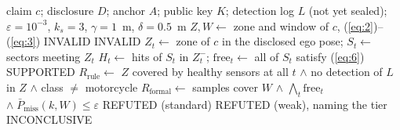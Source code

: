 \begin{algorithm}[!t]
\caption{Verification of a Claim}
\label{alg:verify}
\footnotesize
\begin{algorithmic}[1]
\Require claim $c$; disclosure $D$; anchor $A$; public key $K$; detection log $L$ (not yet sealed); $\varepsilon=10^{-3}$, $k_s=3$, $\gamma=1$~m, $\delta=0.5$~m
\State $Z, W \gets$ zone and window of $c$, (\ref{eq:2})--(\ref{eq:3})
  \State \Return INVALID
\EndIf
{}
  \State \Return INVALID 
\EndIf
{}
  \State $Z_t \gets$ zone of $c$ in the disclosed ego pose; $S_t \gets$ sectors meeting $Z_t$
  \State $H_t \gets$ hits of $S_t$ in $Z_t^-$;\; $\mathrm{free}_t \gets$ all of $S_t$ satisfy (\ref{eq:6})
\EndFor
{} 
  \State \Return SUPPORTED
\EndIf
\State $R_{\mathrm{rule}} \gets$ $Z$ covered by healthy sensors at all $t$
\Statex \hspace{\algorithmicindent}\quad $\wedge$ no detection of $L$ in $Z$ $\wedge$ class $\neq$ motorcycle
\State $R_{\mathrm{formal}} \gets$ samples cover $W$ $\wedge$ $\bigwedge_t \mathrm{free}_t$
\Statex \hspace{\algorithmicindent}\quad $\wedge\; \bar P_{\mathrm{miss}}(k, W) \le \varepsilon$ \Comment{(\ref{eq:8})}
 \State \Return REFUTED (standard)
 \State \Return REFUTED (weak), naming the tier
\EndIf
\State \Return INCONCLUSIVE
\end{algorithmic}
\end{algorithm}
